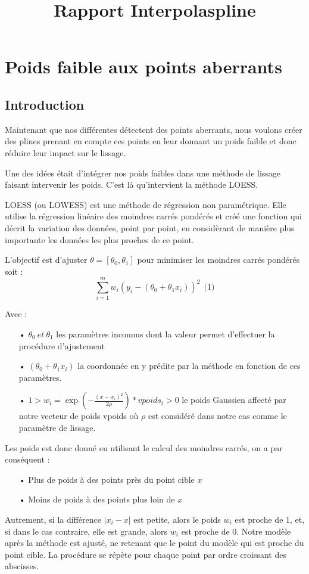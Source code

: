 \documentclass[a4paper,12pt]{article} %
\title{Rapport Interpolaspline}
\begin{document}
\section{Poids faible aux points aberrants}

\subsection{Introduction}
Maintenant que nos différentes détectent des points aberrants, nous voulons créer des plines prenant en compte ces points en leur donnant un poids faible et donc réduire leur impact sur le lissage.

Une des idées était d'intégrer nos poids faibles dans une méthode de lissage faisant intervenir les poids. C'est là qu'intervient la méthode LOESS.

LOESS (ou LOWESS) est une méthode de régression non paramétrique. Elle utilise la régression linéaire des moindres carrés pondérés et créé une fonction qui décrit la variation des données, point par point, en considèrant de manière plus importante les données les plus proches de ce point.

L'objectif est d'ajuster $\theta = [\theta_0, \theta_1]$ pour minimiser les moindres carrés pondérés soit : \[\sum_{i=1}^m w_i ( y_i - (\theta_0 + \theta_1 x_i))^2 \ \ \text{(1)}\]

Avec : 
\begin{itemize}
    \item[•]  $\theta_0 \ et \ \theta_1$ les paramètres inconnus dont la valeur permet d'effectuer la procédure d'ajustement  
    \item[•]  $(\theta_0 + \theta_1 x_i)$ la coordonnée en y prédite par la méthode en fonction de ces paramètres.
    \item[•]  $1 > w_i = \exp \left( - \frac{(x -x_i)^2}{2 \rho} \right)*vpoids_i > 0$ le poids Gaussien affecté par notre vecteur de poids vpoids où  $\rho$ est considéré dans notre cas comme le paramètre de lissage.
\end{itemize}

Les poids est donc donné en utilisant le calcul des moindres carrés, on a par conséquent :
\begin{itemize}
    \item[•] Plus de poids à des points près du point cible $x$ 
    \item[•] Moins de poids à des points plus loin de $x$
\end{itemize}
Autrement, si la différence $| x_i - x |$ est petite, alors le poids $w_i$ est proche de 1, et, si dans le cas contraire, elle est grande, alors $w_i$ est proche de 0. 
Notre modèle après la méthode est ajusté, ne retenant que le point du modèle qui est proche du point cible. La procédure se répète pour chaque point par ordre croissant des abscisses.
\end{document}
